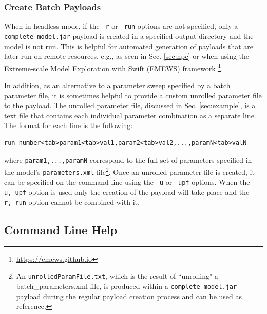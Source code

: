 \documentclass[11pt]{amsart}
\begin{document}
\subsubsection{Create Batch Payloads}
When in headless mode, if the {\tt-r} or {\tt--run} options are not specified, only a {\tt complete\_model.jar} payload is created in a specified output directory and the model is not run. This is helpful for automated generation of payloads that are later run on remote resources, e.g., as seen in Sec. \ref{sec:hpc} or when using the Extreme-scale Model Exploration with Swift (EMEWS) framework \footnote{ \href{https://emews.github.io}{https://emews.github.io}}.

In addition, as an alternative to a parameter sweep specified by a batch parameter file, it is sometimes helpful to provide a custom unrolled parameter file to the payload. The unrolled parameter file, discussed in Sec. \ref{sec:example}, is a text file that contains each individual parameter combination as a separate line. The format for each line is the following:
\begin{verbatim}
run_number<tab>param1<tab>val1,param2<tab>val2,...,paramN<tab>valN
\end{verbatim}
where {\tt param1,...,paramN} correspond to the full set of parameters specified in the model's {\tt parameters.xml} file\footnote{ An {\tt unrolledParamFile.txt}, which is the result of ``unrolling" a batch\_parameters.xml file, is produced within a {\tt complete\_model.jar} payload during the regular payload creation process and can be used as reference.}. Once an unrolled parameter file is created, it can be specified on the command line using the {\tt-u} or {\tt--upf} options. When the {\tt-u,--upf} option is used only the creation of the payload will take place and the {\tt-r,--run} option cannot be combined with it.

\subsection{Command Line Help}
\end{document}
